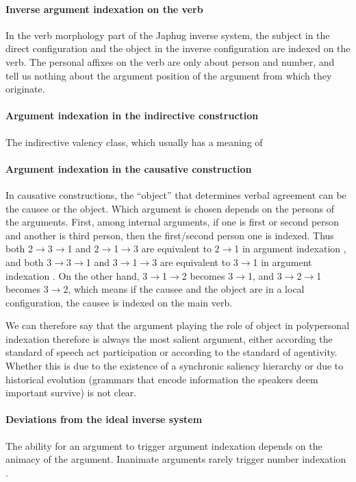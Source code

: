 \documentclass[a4paper, oneside, 12pt]{report}
\newcommand*{\textto}{$\to$}
\newcommand*{\citesec}[1]{\S~{#1}}
\newcommand*{\citepage}[1]{p.~{#1}}
\begin{document}
\paragraph*{Inverse argument indexation on the verb}
In the verb morphology part of the Japhug inverse system, 
the subject in the direct configuration
and the object in the inverse configuration 
are indexed on the verb. 
The personal affixes on the verb are only about person and number, 
and tell us nothing about the argument position of the argument 
from which they originate.


\paragraph*{Argument indexation in the indirective construction}
The indirective valency class, which usually has a meaning of

\paragraph*{Argument indexation in the causative construction}
\label{sec:grammatical.clause.indexation.causative}
In causative constructions, the ``object'' that determines verbal agreement
can be the causee or the object.
Which argument is chosen depends on the persons of the arguments.
First, among internal arguments,
if one is first or second person and another is third person,
then the first/second person one is indexed.
Thus both 2\textto 3\textto 1 and 2\textto 1\textto 3 
are equivalent to 2\textto 1 in argument indexation
\citep[\citepage{584}]{jacques2021grammar},
and both 3\textto 3\textto 1 and 3\textto 1\textto 3 
are equivalent to 3\textto 1 in argument indexation
\citep[\citepage{310}]{jacques2021grammar}.
On the other hand, 3\textto 1\textto 2 becomes 3\textto 1,
and 3\textto 2\textto 1 becomes 3\textto 2,
which means if the causee and the object are in a local configuration,
the causee is indexed on the main verb.

We can therefore say that the argument playing the role of object in polypersonal indexation
therefore is always the most salient argument,
either according the standard of speech act participation or according to the standard of agentivity.
Whether this is due to the existence of a synchronic saliency hierarchy
or due to historical evolution
(grammars that encode information the speakers deem important survive) is not clear.

\paragraph*{Deviations from the ideal inverse system}
The ability for an argument to trigger argument indexation
depends on the animacy of the argument.
Inanimate arguments rarely trigger number indexation 
\citep[\citesec{14.6.1.1}]{jacques2021grammar}.
\end{document}
